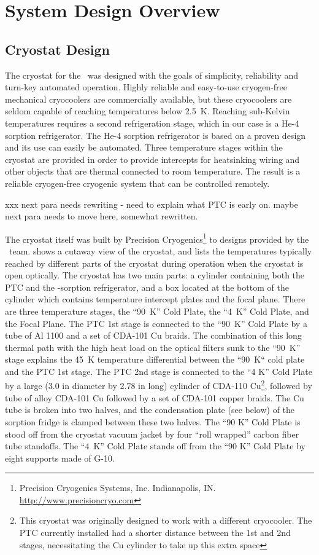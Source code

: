 \chapter{System Design Overview}\label{c:sys-design}

\section{Cryostat Design}\label{s-cryo-design}

The cryostat for the \Imager\ was designed with the goals of simplicity, reliability and turn-key automated operation.
Highly reliable and easy-to-use cryogen-free mechanical cryocoolers are commercially available, but these cryocoolers are seldom capable of reaching temperatures below 2.5~K.
Reaching sub-Kelvin temperatures requires a second refrigeration stage, which in our case is a He-4 sorption refrigerator.
The He-4 sorption refrigerator is based on a proven design and its use can easily be automated.
Three temperature stages within the cryostat are provided in order to provide intercepts for heatsinking wiring and other objects that are thermal connected to room temperature. 
The result is a reliable cryogen-free cryogenic system that can be controlled remotely.

xxx next para needs rewriting - need to explain what PTC is early on. maybe next para needs to move here, somewhat rewritten.

The cryostat itself was built by Precision Cryogenics\footnote{Precision Cryogenics Systems, Inc. Indianapolis, IN. \url{http://www.precisioncryo.com}} to designs provided by the \Imager\ team.
 shows a cutaway view of the cryostat, and  lists the temperatures typically reached by different parts of the cryostat during operation when the cryostat is open optically.
The cryostat has two main parts: a cylinder containing both the PTC and the -sorption refrigerator, and a box located at the bottom of the cylinder which contains temperature intercept plates and the focal plane.
There are three temperature stages, the ``90~K'' Cold Plate, the ``4~K'' Cold Plate, and the Focal Plane.
The PTC 1st stage is connected to the ``90~K'' Cold Plate by a tube of Al 1100 and a set of CDA-101 Cu braids.
The combination of this long thermal path with the high heat load on the optical filters sunk to the ``90~K'' stage explains the 45~K temperature differential between the ``90~K`` cold plate and the PTC 1st stage.
The PTC 2nd stage is connected to the ``4 K'' Cold Plate by a large (3.0 in diameter by 2.78 in long) cylinder of CDA-110 Cu\footnote{This cryostat was originally designed to work with a different cryocooler. The PTC currently installed had a shorter distance between the 1st and 2nd stages, necessitating the Cu cylinder to take up this extra space}, followed by tube of alloy CDA-101 Cu followed by a set of  CDA-101 copper braids.
The Cu tube is broken into two halves, and the condensation plate (see below) of the sorption fridge is clamped between these two halves. The ``90 K'' Cold Plate is stood off from the cryostat vacuum jacket by four ``roll wrapped'' carbon fiber tube standoffs. The ``4~K'' Cold Plate stands off from the ``90 K'' Cold Plate by eight supports made of G-10.

